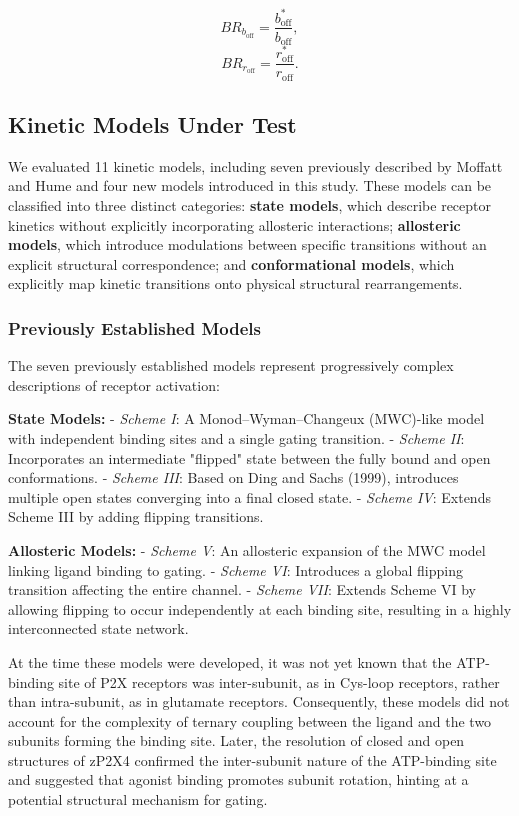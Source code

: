 \documentclass[pdflatex,sn-mathphys-num]{sn-jnl}%
\theoremstyle{thmstyleone}%
\theoremstyle{thmstyletwo}%
\theoremstyle{thmstylethree}%
\begin{document}
\[
BR_{b_{\text{off}}} = \frac{b^*_{\text{off}}}{b_{\text{off}}},
\]
\[
BR_{r_{\text{off}}} = \frac{r^*_{\text{off}}}{r_{\text{off}}}.
\]


\subsection{Kinetic Models Under Test}

We evaluated 11 kinetic models, including seven previously described by Moffatt and Hume \cite{Moffatt_hume} and four new models introduced in this study. These models can be classified into three distinct categories: \textbf{state models}, which describe receptor kinetics without explicitly incorporating allosteric interactions; \textbf{allosteric models}, which introduce modulations between specific transitions without an explicit structural correspondence; and \textbf{conformational models}, which explicitly map kinetic transitions onto physical structural rearrangements.

\subsubsection{Previously Established Models}

The seven previously established models represent progressively complex descriptions of receptor activation:

\textbf{State Models:}  
- \textit{Scheme I}: A Monod–Wyman–Changeux (MWC)-like model with independent binding sites and a single gating transition.  
- \textit{Scheme II}: Incorporates an intermediate "flipped" state between the fully bound and open conformations.  
- \textit{Scheme III}: Based on Ding and Sachs (1999), introduces multiple open states converging into a final closed state.  
- \textit{Scheme IV}: Extends Scheme III by adding flipping transitions.

\textbf{Allosteric Models:}  
- \textit{Scheme V}: An allosteric expansion of the MWC model linking ligand binding to gating.  
- \textit{Scheme VI}: Introduces a global flipping transition affecting the entire channel.  
- \textit{Scheme VII}: Extends Scheme VI by allowing flipping to occur independently at each binding site, resulting in a highly interconnected state network.

At the time these models were developed, it was not yet known that the ATP-binding site of P2X receptors was inter-subunit, as in Cys-loop receptors, rather than intra-subunit, as in glutamate receptors. Consequently, these models did not account for the complexity of ternary coupling between the ligand and the two subunits forming the binding site. Later, the resolution of closed and open structures of zP2X4 \cite{cerrada_p2x, abierta_p2x} confirmed the inter-subunit nature of the ATP-binding site and suggested that agonist binding promotes subunit rotation, hinting at a potential structural mechanism for gating.
\end{document}
